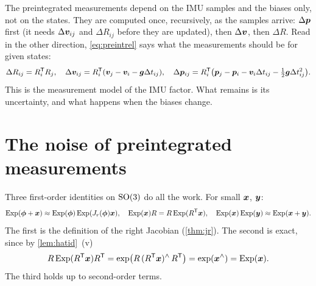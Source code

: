 The preintegrated measurements depend on the IMU samples and the biases
only, not on the states. They are computed once, recursively, as the
samples arrive: $\Delta\bm{p}$ first (it needs $\Delta\bm{v}_{ij}$ and
$\Delta R_{ij}$ before they are updated), then $\Delta\bm{v}$, then
$\Delta R$. Read in the other direction, \eqref{eq:preintrel} says what
the measurements should be for given states:
\begin{equation}\label{eq:preintinv}
\Delta R_{ij}=R_i^{\mathsf{T}} R_j,\quad
\Delta\bm{v}_{ij}=R_i^{\mathsf{T}}(\bm{v}_j-\bm{v}_i-\bm{g}\Delta t_{ij}),\quad
\Delta\bm{p}_{ij}=R_i^{\mathsf{T}}\bigl(\bm{p}_j-\bm{p}_i-\bm{v}_i\Delta t_{ij}-\tfrac12
\bm{g}\Delta t_{ij}^2\bigr).
\end{equation}
This is the measurement model of the IMU factor. What remains is its
uncertainty, and what happens when the biases change.

\section{The noise of preintegrated measurements}

Three first-order identities on $\mathrm{SO}(3)$ do all the work. For small
$\bm{x}$, $\bm{y}$:
\begin{equation}\label{eq:so3id}
\operatorname{Exp}(\bm{\phi}+\bm{x})\approx\operatorname{Exp}(\bm{\phi})\operatorname{Exp}(J_r(\bm{\phi})\bm{x}),\quad
\operatorname{Exp}(\bm{x})R=R\operatorname{Exp}(R^{\mathsf{T}}\bm{x}),\quad
\operatorname{Exp}(\bm{x})\operatorname{Exp}(\bm{y})\approx\operatorname{Exp}(\bm{x}+\bm{y}).
\end{equation}
The first is the definition of the right Jacobian (\cref{thm:jr}). The
second is exact, since by \cref{lem:hatid}~(v)
\[
R\operatorname{Exp}(R^{\mathsf{T}}\bm{x})R^{\mathsf{T}}=\exp\bigl(R\,(R^{\mathsf{T}}\bm{x})^{\wedge}\,R^{\mathsf{T}}\bigr)
=\exp(\bm{x}^{\wedge})=\operatorname{Exp}(\bm{x}).
\]
The third holds up to second-order terms.

